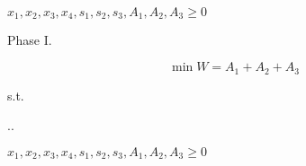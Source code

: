 \documentclass[spanish,letterpaper,11pt]{exam}
\begin{document}
\begin{questions}
\begin{solution}
{    $x_1, x_2, x_3, x_4, s_1, s_2, s_3, A_1, A_2, A_3  \geq 0$
  \par}


  Phase I.

  \[ \min W = A_1 + A_2 + A_3 \]

    {\centering
      s.t.
    
      \sysdelim..%
    

    $x_1, x_2, x_3, x_4, s_1, s_2, s_3, A_1, A_2, A_3  \geq 0$
    \par}
  \end{solution}

\end{questions}
\end{document}
